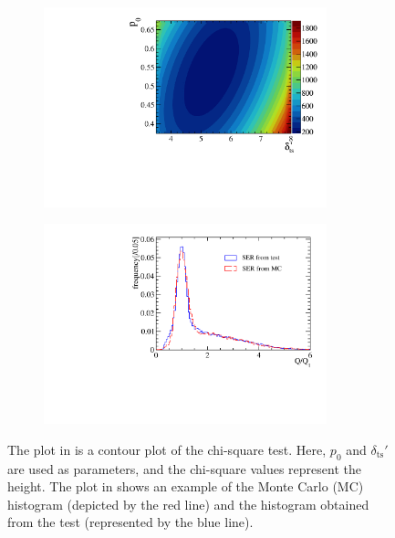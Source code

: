 \begin{figure}[htbp]
	\centering
	\begin{subfigure}{0.5\textwidth}
		\centering
		\includegraphics[width=0.9\textwidth]{PMTRelated/GTmodel/cour.pdf}
		\caption{}
		\label{fig:cour}
	\end{subfigure}%
	\hfill
	\begin{subfigure}{0.5\textwidth}
		\centering
		\includegraphics[width=0.9\textwidth]{PMTRelated/GTmodel/hist.pdf}
		\caption{}
		\label{fig:hist}
	\end{subfigure}
	\caption{The plot in  is a contour plot of the chi-square test. Here, $p_0$ and $\delta_{\mathrm{ts}}'$ are used as parameters, and the chi-square values represent the height. The plot in  shows an example of the Monte Carlo (MC) histogram (depicted by the red line) and the histogram obtained from the test (represented by the blue line).
	}
	\label{fig:chi}
\end{figure}

